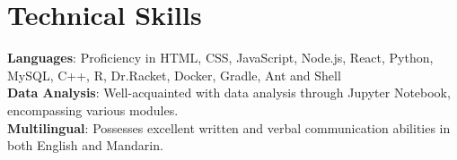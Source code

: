 \documentclass[letterpaper,11pt]{article}
\begin{document}
%
\section{Technical Skills}
 \begin{itemize}[leftmargin=0.15in, label={}]
    \small{\item{
     \textbf{Languages}{: Proficiency in HTML, CSS, JavaScript, Node.js, React, Python, MySQL, C++, R, Dr.Racket, Docker, Gradle, Ant and Shell} \\
     \textbf{Data Analysis}{: Well-acquainted with data analysis through Jupyter Notebook, encompassing various modules.} \\
     \textbf{Multilingual}{: Possesses excellent written and verbal communication abilities in both English and Mandarin.}
    }}
 \end{itemize}


\end{document}
